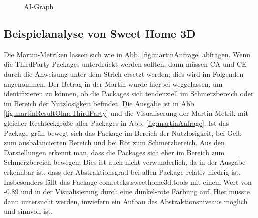\documentclass[12pt]{article}
\begin{document}
\begin{figure}[H]
        \centering
{}
\caption{AI-Graph \cite{Mar94}}
\label{fig:ai-graph}
\end{figure}

\subsection{Beispielanalyse von Sweet Home 3D}

Die Martin-Metriken lassen sich wie in Abb.
\ref{fig:martinAnfrage} abfragen. Wenn die ThirdParty Packages
unterdrückt werden sollten, dann müssen CA und CE durch die
Anweisung unter dem Strich ersetzt werden; dies wird im Folgenden
angenommen. Der Betrag in der Martin wurde hierbei weggelassen,
um identifizieren zu können, ob die Packages sich tendenziell im
Schmerzbereich oder im Bereich der Nutzlosigkeit befindet. Die
Ausgabe ist in Abb.  \ref{fig:martinResultOhneThirdParty} und die
Visualiserung der Martin Metrik mit gleicher Rechteckgröße aller
Packages in Abb.  \ref{fig:martinAnfrage}. Ist das Package grün
bewegt sich das Package im Bereich der Nutzlosigkeit, bei Gelb
zum ausbalancierten Bereich und bei Rot zum Schmerzbereich. Aus
den Darstellungen erkennt man, dass die Packages sich eher im
Bereich zum Schmerzbereich bewegen. Dies ist auch nicht
verwunderlich, da in der Ausgabe erkennbar ist, dass der
Abstraktionsgrad bei allen Package relativ niedrig ist.
Insbesonders fällt das Package com.eteks.sweethome3d.tools mit
einem Wert von -0.89 und in der Visualisierung durch eine
dunkel-rote Färbung auf. Hier müsste dann untersucht werden,
inwiefern ein Aufbau des Abstraktionsniveaus möglich und sinnvoll
ist. 
\end{document}
